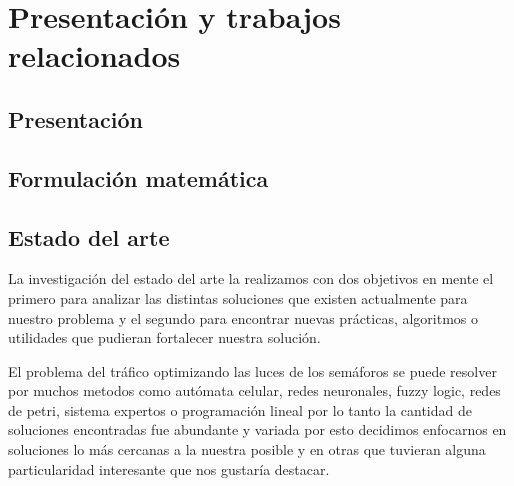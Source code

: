 \chapter{Presentación y trabajos relacionados}

\section{Presentación}
\section{Formulación matemática}
\section{Estado del arte}
La investigación del estado del arte la realizamos con dos objetivos en mente el primero para analizar las distintas soluciones que existen actualmente para nuestro problema y el segundo para encontrar nuevas prácticas, algoritmos o utilidades que pudieran fortalecer nuestra solución.

El problema del tráfico optimizando las luces de los semáforos se puede resolver por muchos metodos como autómata celular, redes neuronales, fuzzy logic, redes de petri, sistema expertos o programación lineal por lo tanto la cantidad de soluciones encontradas fue abundante y variada por esto decidimos enfocarnos en soluciones lo más cercanas a la nuestra posible y en otras que tuvieran alguna particularidad interesante que nos gustaría destacar.


